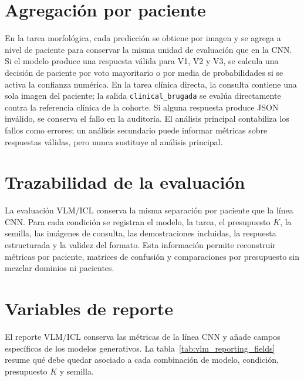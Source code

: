 \section{Agregación por paciente}

En la tarea morfológica, cada predicción se obtiene por imagen y se agrega a nivel de paciente para conservar la misma unidad de evaluación que en la CNN. Si el modelo produce una respuesta válida para V1, V2 y V3, se calcula una decisión de paciente por voto mayoritario o por media de probabilidades si se activa la confianza numérica. En la tarea clínica directa, la consulta contiene una sola imagen del paciente; la salida \texttt{clinical\_brugada} se evalúa directamente contra la referencia clínica de la cohorte. Si alguna respuesta produce JSON inválido, se conserva el fallo en la auditoría. El análisis principal contabiliza los fallos como errores; un análisis secundario puede informar métricas sobre respuestas válidas, pero nunca sustituye al análisis principal.

\section{Trazabilidad de la evaluación}

La evaluación VLM/ICL conserva la misma separación por paciente que la línea CNN. Para cada condición se registran el modelo, la tarea, el presupuesto \(K\), la semilla, las imágenes de consulta, las demostraciones incluidas, la respuesta estructurada y la validez del formato. Esta información permite reconstruir métricas por paciente, matrices de confusión y comparaciones por presupuesto sin mezclar dominios ni pacientes.

\section{Variables de reporte}

El reporte VLM/ICL conserva las métricas de la línea CNN y añade campos específicos de los modelos generativos. La tabla~\ref{tab:vlm_reporting_fields} resume qué debe quedar asociado a cada combinación de modelo, condición, presupuesto \(K\) y semilla.

